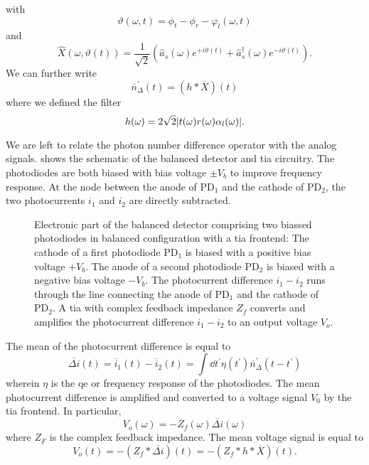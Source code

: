 with
\begin{equation}
	\vartheta(\omega,t)
	=
	\phi_t-\phi_r-\varphi_l(\omega,t)
\end{equation}
and
\begin{equation}
	\hat{X}\left(\omega,\vartheta(t)\right)
	=
	\frac{1}{\sqrt{2}}
	\left(
		\hat{a}_s(\omega)
		e^{+i\vartheta(t)}
		+
		\hat{a}_s^\dagger(\omega)
		e^{-i\vartheta(t)}
	\right)
	.
\end{equation}
We can further write
\begin{equation}
	\overline{n}^\prime_\Delta(t)
	=
	\left(h*\overline{X}\right)(t)
\end{equation}
where we defined the filter
\begin{equation}
	h(\omega)
	=
	2\sqrt{2}
	\lvert t(\omega)r(\omega)\alpha_l(\omega)\rvert
	.
\end{equation}

We are left to relate the photon number difference operator with the analog signals.
 shows the schematic of the balanced detector and \gls{tia} circuitry.
The photodiodes are both biased with bias voltage $\pm V_b$ to improve frequency response.
At the node between the anode of $\text{PD}_1$ and the cathode of $\text{PD}_2$, the two photocurrents $i_1$ and $i_2$ are directly subtracted.
\begin{figure}[htb]
    \centering
    
    \caption{Electronic part of the balanced detector comprising two biassed photodiodes in balanced configuration with a \gls{tia} frontend: The cathode of a first photodiode $\text{PD}_1$ is biased with a positive bias voltage $+V_b$. The anode of a second photodiode $\text{PD}_2$ is biased with a negative bias voltage $-V_b$. The photocurrent difference $i_1-i_2$ runs through the line connecting the anode of $\text{PD}_1$ and the cathode of $\text{PD}_2$. A \gls{tia} with complex feedback impedance $Z_f$ converts and amplifies the photocurrent difference $i_1-i_2$ to an output voltage $V_o$.}\label{fig:balanced_detector_electronics}
\end{figure}
The mean of the photocurrent difference is equal to
\begin{equation}
	\overline{\Delta i}(t)
	=
	\overline{i}_1(t)
	-
	\overline{i}_2(t)
	=
	\int\dd{t^\prime}
	\eta(t^\prime)
	\overline{n}_\Delta^\prime(t-t^\prime)
\end{equation}
wherein $\eta$ is the \gls{qe} or frequency response of the photodiodes.
The mean photocurrent difference is amplified and converted to a voltage signal $V_0$ by the \gls{tia} frontend.
In particular,
\begin{equation}
	V_o(\omega)
	=
	-
	Z_f(\omega)
	\overline{\Delta i}(\omega)
\end{equation}
where $Z_F$ is the complex feedback impedance.
The mean voltage signal is equal to
\begin{equation}
	V_o(t)
	=
	-
	\left(Z_f*\overline{\Delta i}\right)(t)
	=
	-
	\left(Z_f*h*\overline{X}\right)(t)
	.
\end{equation}

